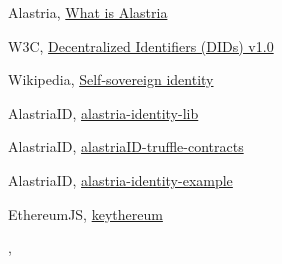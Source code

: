 \documentclass[target=mst,aauheader=]{thud}
\begin{document}
\begin{thebibliography}{99}
    Alastria, \href{https://alastria.io/en/what-is-alastria/}{What is Alastria}


    W3C, \href{https://w3c.github.io/did-core/}{Decentralized Identifiers (DIDs) v1.0}

    Wikipedia, \href{https://en.wikipedia.org/wiki/Self-sovereign_identity}{Self-sovereign identity}

    AlastriaID, \href{https://github.com/alastria/alastria-identity-lib}{alastria-identity-lib}

    AlastriaID, \href{https://github.com/alastria/alastriaID-truffle-contracts}{alastriaID-truffle-contracts}

    AlastriaID, \href{https://github.com/alastria/alastria-identity-example}{alastria-identity-example}

    EthereumJS, \href{https://github.com/ethereumjs/keythereum}{keythereum}

    \bibitem{}
    , \href{}{}

\end{thebibliography}

\end{document}
